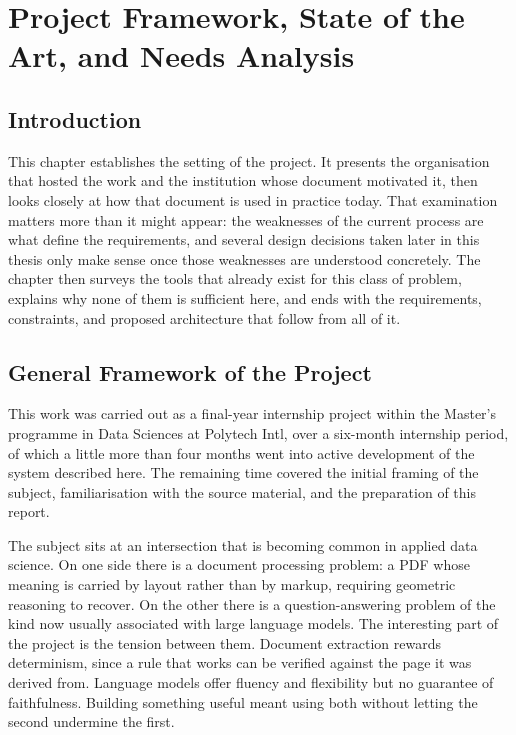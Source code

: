 \chapter{Project Framework, State of the Art, and Needs Analysis}
\minitoc

\section*{Introduction}

This chapter establishes the setting of the project. It presents the organisation that hosted the work and the institution whose document motivated it, then looks closely at how that document is used in practice today. That examination matters more than it might appear: the weaknesses of the current process are what define the requirements, and several design decisions taken later in this thesis only make sense once those weaknesses are understood concretely. The chapter then surveys the tools that already exist for this class of problem, explains why none of them is sufficient here, and ends with the requirements, constraints, and proposed architecture that follow from all of it.

\section{General Framework of the Project}

This work was carried out as a final-year internship project within the Master's programme in Data Sciences at Polytech Intl, over a six-month internship period, of which a little more than four months went into active development of the system described here. The remaining time covered the initial framing of the subject, familiarisation with the source material, and the preparation of this report.

The subject sits at an intersection that is becoming common in applied data science. On one side there is a document processing problem: a PDF whose meaning is carried by layout rather than by markup, requiring geometric reasoning to recover. On the other there is a question-answering problem of the kind now usually associated with large language models. The interesting part of the project is the tension between them. Document extraction rewards determinism, since a rule that works can be verified against the page it was derived from. Language models offer fluency and flexibility but no guarantee of faithfulness. Building something useful meant using both without letting the second undermine the first.


